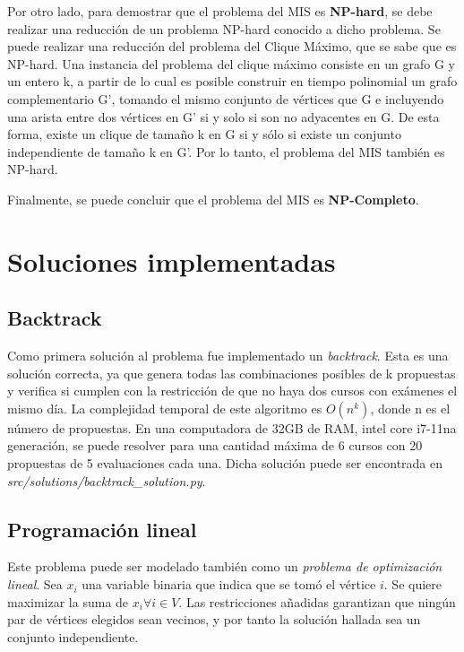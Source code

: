 \documentclass[10pt]{article} %
\begin{document}
	Por otro lado, para demostrar que el problema del MIS es \textbf{NP-hard}, se debe realizar una reducción de un problema NP-hard conocido a dicho problema. Se puede realizar una reducción del problema del Clique M\'aximo, que se sabe que es NP-hard. 
	Una instancia del problema del clique m\'aximo consiste en un grafo G y un entero k, a partir de lo cual es posible construir en tiempo polinomial un grafo complementario G', tomando el mismo conjunto de vértices que G e incluyendo una arista entre dos vértices en G' si y solo si son no adyacentes en G. De esta forma, existe un clique de tamaño k en G si y sólo si existe un conjunto independiente de tamaño k en G'. Por lo tanto, el problema del MIS también es NP-hard.

	Finalmente, se puede concluir que el problema del MIS es \textbf{NP-Completo}.
	
	\section{Soluciones implementadas}
	
	\subsection{Backtrack}
	
		Como primera solución al problema fue implementado un \textit{backtrack}. Esta es una solución correcta, ya que  genera todas las combinaciones posibles de k propuestas y verifica si cumplen con la restricción de que no haya dos cursos con exámenes el mismo día. La complejidad temporal de este algoritmo es $O(n^k)$, donde n es el número de propuestas. En una computadora de 32GB de RAM, intel core i7-11na generación, se puede resolver para una cantidad máxima de 6 cursos con 20 propuestas de 5 evaluaciones cada una. Dicha solución puede ser encontrada en \textit{src/solutions/backtrack\_solution.py}.
		
	\subsection{Programaci\'on lineal}
	
	Este problema puede ser modelado tambi\'en como un \textit{problema de optimizaci\'on lineal}. Sea $ x_{i} $ una variable binaria que indica que se tom\'o el v\'ertice $ i $. Se quiere maximizar la suma de $ x_i \forall i \in V $. Las restricciones a\~nadidas  garantizan que ning\'un par de v\'ertices elegidos sean vecinos, y por tanto la soluci\'on hallada sea un conjunto independiente. 
		
\end{document}
